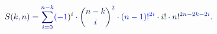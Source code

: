 \documentclass[12pt]{article}
\begin{document}
\makeatletter
\renewcommand*{\@textcolor}[3]{%
  \protect\leavevmode
  \begingroup
    \color#1{#2}#3%
  \endgroup
}
\makeatother
\begin{displaymath}
\mathcolor[RGB]{0,0,15}{S} \mathcolor[RGB]{0,0,30}{(} \mathcolor[RGB]{0,0,45}{k} \mathcolor[RGB]{0,0,60}{,} \mathcolor[RGB]{0,0,75}{n} \mathcolor[RGB]{0,0,90}{)} \mathcolor[RGB]{0,0,105}{=} \mathcolor[RGB]{0,0,120}{\sum} _ { \mathcolor[RGB]{0,0,135}{i} \mathcolor[RGB]{0,0,150}{=} \mathcolor[RGB]{0,0,165}{0} } ^ { \mathcolor[RGB]{0,0,180}{n} \mathcolor[RGB]{0,0,195}{-} \mathcolor[RGB]{0,0,210}{k} } \mathcolor[RGB]{0,0,225}{(} \mathcolor[RGB]{0,0,240}{-} \mathcolor[RGB]{0,0,255}{1} \mathcolor[RGB]{0,15,0}{)} ^ { \mathcolor[RGB]{0,15,15}{i} } \mathcolor[RGB]{0,15,30}{\cdot} \mathcolor[RGB]{0,15,45}{\binom { \mathcolor[RGB]{0,15,60}{n} \mathcolor[RGB]{0,15,75}{-} \mathcolor[RGB]{0,15,90}{k} } { \mathcolor[RGB]{0,15,105}{i} } } ^ { \mathcolor[RGB]{0,15,120}{2} } \mathcolor[RGB]{0,15,135}{\cdot} \mathcolor[RGB]{0,15,150}{(} \mathcolor[RGB]{0,15,165}{n} \mathcolor[RGB]{0,15,180}{-} \mathcolor[RGB]{0,15,195}{1} \mathcolor[RGB]{0,15,210}{)} \mathcolor[RGB]{0,15,225}{!} ^ { \mathcolor[RGB]{0,15,240}{2} \mathcolor[RGB]{0,15,255}{i} } \mathcolor[RGB]{0,30,0}{\cdot} \mathcolor[RGB]{0,30,15}{i} \mathcolor[RGB]{0,30,30}{!} \mathcolor[RGB]{0,30,45}{\cdot} \mathcolor[RGB]{0,30,60}{n} \mathcolor[RGB]{0,30,75}{!} ^ { \mathcolor[RGB]{0,30,90}{2} \mathcolor[RGB]{0,30,105}{n} \mathcolor[RGB]{0,30,120}{-} \mathcolor[RGB]{0,30,135}{2} \mathcolor[RGB]{0,30,150}{k} \mathcolor[RGB]{0,30,165}{-} \mathcolor[RGB]{0,30,180}{2} \mathcolor[RGB]{0,30,195}{i} } \mathcolor[RGB]{0,30,210}{.}
\end{displaymath}
\end{document}
